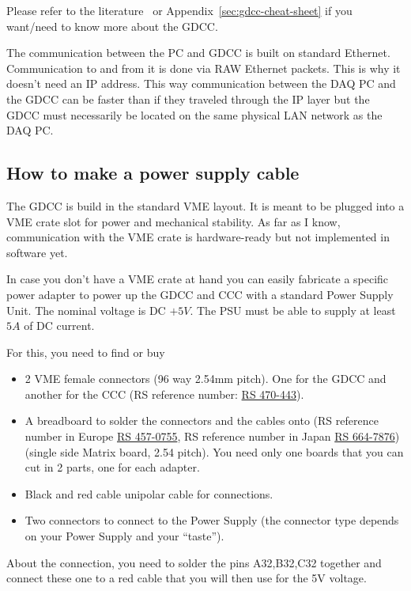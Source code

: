 Please refer to the literature~\cite{GDCC:2012} or
Appendix~\ref{sec:gdcc-cheat-sheet} if you want/need to know more about the
GDCC.

The communication between the PC and GDCC is built on standard
Ethernet. Communication to and from it is done via RAW Ethernet packets. This is
why it doesn't need an IP address. This way communication between the DAQ PC and
the GDCC can be faster than if they traveled through the IP layer but the GDCC
must necessarily be located on the same physical LAN network as the DAQ PC.

\subsection{How to make a power supply cable}
The GDCC is build in the standard VME layout. It is meant to be plugged into a
VME crate slot for power and mechanical stability. As far as I know,
communication with the VME crate is hardware-ready but not implemented in
software yet.

In case you don't have a VME crate at hand you can easily fabricate a specific
power adapter to power up the GDCC and CCC with a standard Power Supply
Unit. The nominal voltage is DC $+5V$. The PSU must be able to supply at least
$5A$ of DC current.

For this, you need to find or buy
\begin{itemize}
\item 2 VME female connectors (96 way 2.54mm pitch). One for the GDCC and
  another for the CCC (RS reference number:
  \href{https://jp.rs-online.com/web/p/din-41612-connectors/0470443/?sra=pstk}{RS
    470-443}).
\item A breadboard to solder the connectors and the cables onto (RS reference
  number in Europe
  \href{https://uk.rs-online.com/web/p/matrix-boards/4570755/}{RS 457-0755}, RS
  reference number in Japan
  \href{https://jp.rs-online.com/web/p/matrix-boards/6647876/?sra=pstk}{RS
    664-7876}) (single side Matrix board, 2.54 pitch). You need only one boards
  that you can cut in 2 parts, one for each adapter.
\item Black and red cable unipolar cable for connections.
\item Two connectors to connect to the Power Supply (the connector type depends
  on your Power Supply and your ``taste'').
\end{itemize}

About the connection, you need to solder the pins A32,B32,C32 together and
connect these one to a red cable that you will then use for the 5V voltage.

